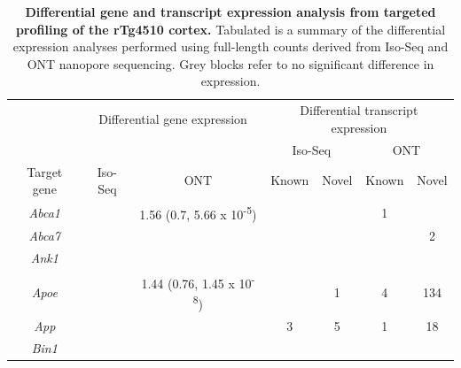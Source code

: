 \begin{landscape}
	\begin{table}[]
		\centering
		\captionsetup{width=1.5\textwidth}
		\caption[Differential expression analysis from targeted profiling of the rTg4510 cortex]%
		{\textbf{Differential gene and transcript expression analysis from targeted profiling of the rTg4510 cortex.} Tabulated is a summary of the differential expression analyses performed using full-length counts derived from Iso-Seq and ONT nanopore sequencing. Grey blocks refer to no significant difference in expression.}
		\label{tab: de_analysis}
		\setlength\tabcolsep{10pt} %
		\begin{threeparttable}
			\begin{tabular}{@{}ccccccc@{}}
				\toprule
				&
				\multicolumn{2}{c}{Differential gene expression\tnote{a} } &
				\multicolumn{4}{c}{Differential transcript expression\tnote{b}} \\ \cmidrule(l){2-7} 
				&
				&
				&
				\multicolumn{2}{c}{Iso-Seq} &
				\multicolumn{2}{c}{ONT} \\ \cmidrule(l){4-7} 
				\multirow{-3}{*}{Target gene} &
				\multirow{-2}{*}{Iso-Seq} &
				\multirow{-2}{*}{ONT} &
				Known &
				Novel &
				Known &
				Novel \\ \midrule
				\textit{Abca1} &
				\cellcolor[HTML]{EFEFEF} &
				1.56 (0.7, 5.66 x 10\textsuperscript{-5}) &
				\cellcolor[HTML]{EFEFEF} &
				\cellcolor[HTML]{EFEFEF} &
				1 &
				\cellcolor[HTML]{EFEFEF} \\
				\textit{Abca7} &
				\cellcolor[HTML]{EFEFEF} &
				\cellcolor[HTML]{EFEFEF} &
				\cellcolor[HTML]{EFEFEF} &
				\cellcolor[HTML]{EFEFEF} &
				\cellcolor[HTML]{EFEFEF} &
				2 \\
				\textit{Ank1} &
				\cellcolor[HTML]{EFEFEF} &
				\cellcolor[HTML]{EFEFEF} &
				\cellcolor[HTML]{EFEFEF} &
				\cellcolor[HTML]{EFEFEF} &
				\cellcolor[HTML]{EFEFEF} &
				\cellcolor[HTML]{EFEFEF} \\
				\textit{Apoe} &
				\cellcolor[HTML]{EFEFEF} &
				1.44 (0.76, 1.45 x 10\textsuperscript{-8}) &
				\cellcolor[HTML]{EFEFEF}&
				1 &
				4 &
				134 \\
				\textit{App} &
				\cellcolor[HTML]{EFEFEF} &
				\cellcolor[HTML]{EFEFEF} &
				3 &
				5 &
				1 &
				18 \\
				\textit{Bin1} &
				\cellcolor[HTML]{EFEFEF} &
				\cellcolor[HTML]{EFEFEF} &
				\cellcolor[HTML]{EFEFEF} &
				\cellcolor[HTML]{EFEFEF} &

\end{tabular}
\end{threeparttable}
\end{table}
\end{landscape}
